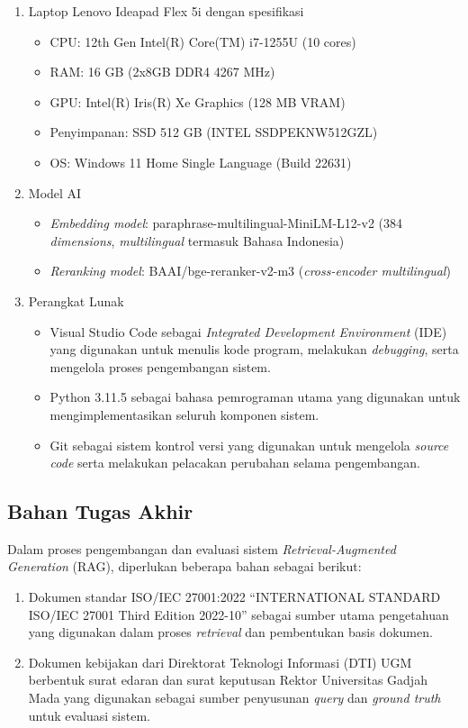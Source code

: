 \begin{enumerate}
	\item Laptop Lenovo Ideapad Flex 5i dengan spesifikasi
	\begin{itemize}
		\item CPU: 12th Gen Intel(R) Core(TM) i7-1255U (10 cores)
		\item RAM: 16 GB (2x8GB DDR4 4267 MHz)
		\item GPU: Intel(R) Iris(R) Xe Graphics (128 MB VRAM)
		\item Penyimpanan: SSD 512 GB (INTEL SSDPEKNW512GZL)
		\item OS: Windows 11 Home Single Language (Build 22631)
	\end{itemize}

	\item Model AI
	\begin{itemize}
		\item \textit{Embedding model}: paraphrase-multilingual-MiniLM-L12-v2 (384 \textit{dimensions}, \textit{multilingual} termasuk Bahasa Indonesia)
		\item \textit{Reranking model}: BAAI/bge-reranker-v2-m3 (\textit{cross-encoder multilingual})
	\end{itemize}

	\item Perangkat Lunak
	\begin{itemize}
		\item Visual Studio Code sebagai \textit{Integrated Development Environment} (IDE) yang digunakan untuk menulis kode program, melakukan \textit{debugging}, serta mengelola proses pengembangan sistem.
		\item Python 3.11.5 sebagai bahasa pemrograman utama yang digunakan untuk mengimplementasikan seluruh komponen sistem.
		\item Git sebagai sistem kontrol versi yang digunakan untuk mengelola \textit{source code} serta melakukan pelacakan perubahan selama pengembangan.
	\end{itemize}
\end{enumerate}

\subsection{Bahan Tugas Akhir}

Dalam proses pengembangan dan evaluasi sistem \textit{Retrieval-Augmented Generation} (RAG), diperlukan beberapa bahan sebagai berikut:

\begin{enumerate}
	\item Dokumen standar ISO/IEC 27001:2022 ``INTERNATIONAL STANDARD ISO/IEC 27001 Third Edition 2022-10'' sebagai sumber utama pengetahuan yang digunakan dalam proses \textit{retrieval} dan pembentukan basis dokumen.
	\item Dokumen kebijakan dari Direktorat Teknologi Informasi (DTI) UGM berbentuk surat edaran dan surat keputusan Rektor Universitas Gadjah Mada yang digunakan sebagai sumber penyusunan \textit{query} dan \textit{ground truth} untuk evaluasi sistem.
\end{enumerate}

